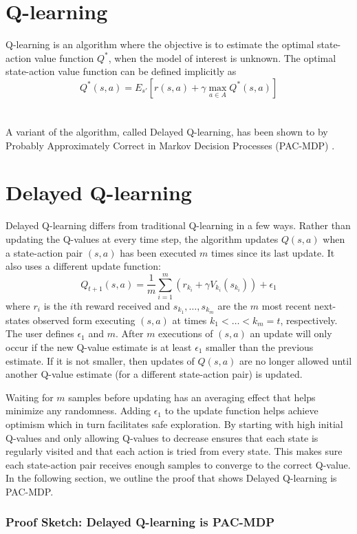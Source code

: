 \documentclass{article} %
\begin{document}
\section{Q-learning}
Q-learning is an algorithm where the objective is to estimate the optimal state-action value function $Q^*$, when the model of interest is unknown. The optimal state-action value function can be defined implicitly as
$$
Q^*(s,a) = E_{s'}[r(s,a) + \gamma \max_{a \in A}Q^*(s,a)]
$$
\\
\\
A variant of the algorithm, called Delayed Q-learning, has been shown to by Probably Approximately Correct in Markov Decision Processes (PAC-MDP) \cite{strehl_pac_2006}.
\section{Delayed Q-learning}
Delayed Q-learning differs from traditional Q-learning in a few ways.  Rather than updating the Q-values at every time step, the algorithm updates $Q(s,a)$ when a state-action pair $(s,a)$ has been executed $m$ times since its last update.  It also uses a different update function:
$$Q_{t+1}(s,a) = \frac{1}{m}\sum_{i=1}^m(r_{k_i}+\gamma V_{k_i}(s_{k_i})) + \epsilon_1$$  
where $r_i$ is the $i$th reward received and $s_{k_1},\dots,s_{k_m}$ are the $m$ most recent next-states observed form executing $(s,a)$ at times $k_1 < \dots < k_m = t$, respectively. The user defines $\epsilon_1$ and $m$.   
After $m$ executions of $(s,a)$ an update will only occur if the new Q-value estimate is at least $\epsilon_1$ smaller than the previous estimate.  If it is not smaller, then updates of $Q(s,a)$ are no longer allowed until another Q-value estimate (for a different state-action pair) is updated.

Waiting for $m$ samples before updating has an averaging effect that helps minimize any randomness. Adding $\epsilon_1$ to the update function helps achieve optimism which in turn facilitates safe exploration. By starting with high initial Q-values and only allowing Q-values to decrease ensures that each state is regularly visited and that each action is tried from every state.  This makes sure each state-action pair receives enough samples to converge to the correct Q-value.%
In the following section, we outline the proof that shows Delayed Q-learning is PAC-MDP.


\subsubsection{Proof Sketch: Delayed Q-learning is PAC-MDP}
\end{document}
